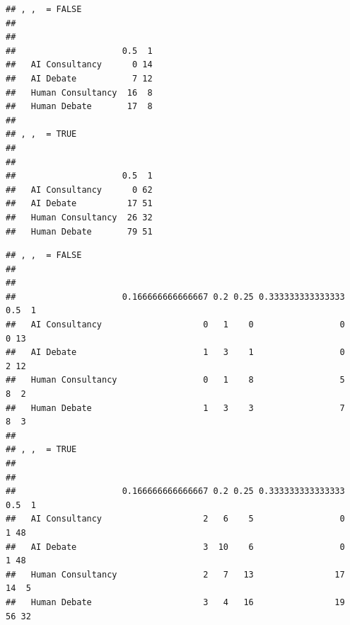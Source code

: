 \documentclass[
]{article}
\newenvironment{Shaded}{\begin{snugshade}}{\end{snugshade}}
\newcommand{\CommentTok}[1]{\textcolor[rgb]{0.56,0.35,0.01}{\textit{#1}}}
\newcommand{\ConstantTok}[1]{\textcolor[rgb]{0.56,0.35,0.01}{#1}}
\newcommand{\FunctionTok}[1]{\textcolor[rgb]{0.13,0.29,0.53}{\textbf{#1}}}
\newcommand{\NormalTok}[1]{#1}
\newcommand{\OtherTok}[1]{\textcolor[rgb]{0.56,0.35,0.01}{#1}}
\newcommand{\SpecialCharTok}[1]{\textcolor[rgb]{0.81,0.36,0.00}{\textbf{#1}}}
\newcommand{\StringTok}[1]{\textcolor[rgb]{0.31,0.60,0.02}{#1}}
\begin{document}
\begin{Shaded}
\end{Shaded}

\begin{verbatim}
## , ,  = FALSE
## 
##                    
##                     0.5  1
##   AI Consultancy      0 14
##   AI Debate           7 12
##   Human Consultancy  16  8
##   Human Debate       17  8
## 
## , ,  = TRUE
## 
##                    
##                     0.5  1
##   AI Consultancy      0 62
##   AI Debate          17 51
##   Human Consultancy  26 32
##   Human Debate       79 51
\end{verbatim}

\begin{Shaded}
\end{Shaded}

\begin{verbatim}
## , ,  = FALSE
## 
##                    
##                     0.166666666666667 0.2 0.25 0.333333333333333 0.5  1
##   AI Consultancy                    0   1    0                 0   0 13
##   AI Debate                         1   3    1                 0   2 12
##   Human Consultancy                 0   1    8                 5   8  2
##   Human Debate                      1   3    3                 7   8  3
## 
## , ,  = TRUE
## 
##                    
##                     0.166666666666667 0.2 0.25 0.333333333333333 0.5  1
##   AI Consultancy                    2   6    5                 0   1 48
##   AI Debate                         3  10    6                 0   1 48
##   Human Consultancy                 2   7   13                17  14  5
##   Human Debate                      3   4   16                19  56 32
\end{verbatim}
\end{document}
